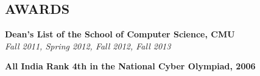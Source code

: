 \documentclass[margin, 11pt]{res} %
\begin{document}
\begin{resume}

\section{AWARDS}

{\bf Dean's List of the School of Computer Science, CMU}\\
{\sl  Fall 2011, Spring 2012, Fall 2012, Fall 2013}

\vspace{5pt}

{\bf All India Rank 4th in the National Cyber Olympiad, 2006}


\end{resume}
\end{document}
